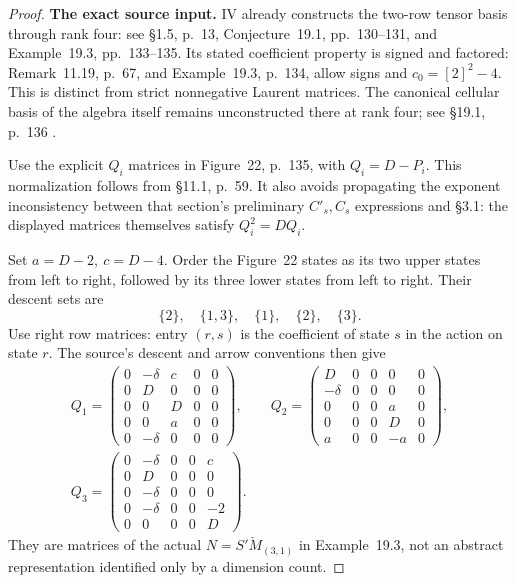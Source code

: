 \begin{proof}
\par\smallskip\noindent\textbf{The exact source input.}\quad
IV already constructs the two-row tensor basis through rank four:
see \S1.5, p.~13, Conjecture~19.1, pp.~130--131, and
Example~19.3, pp.~133--135.
Its stated coefficient property is signed and factored:
Remark~11.19, p.~67, and Example~19.3, p.~134, allow signs and
\(c_0=[2]^2-4\).
This is distinct from strict nonnegative Laurent matrices.
The canonical cellular basis of the algebra itself remains
unconstructed there at rank four; see \S19.1, p.~136
\cite{IV}.

Use the explicit \(Q_i\) matrices in Figure~22, p.~135,
with \(Q_i=D-P_i\).
This normalization follows from \S11.1, p.~59.
It also avoids propagating the exponent inconsistency between
that section's preliminary \(C'_s,C_s\) expressions and
\S3.1: the displayed matrices themselves satisfy \(Q_i^2=DQ_i\).

Set \(a=D-2,\ c=D-4\). Order the Figure~22 states as its
two upper states from left to right, followed by its three
lower states from left to right. Their descent sets are
\[
 \{2\},\quad\{1,3\},\quad\{1\},\quad\{2\},\quad\{3\}.
\]
Use right row matrices: entry \((r,s)\) is the coefficient of
state \(s\) in the action on state \(r\). The source's descent
and arrow conventions then give
\begin{equation}\label{eq:rankfourfivecellmatrices}
\begin{gathered}
Q_1=\begin{pmatrix}
0&-\delta&c&0&0\\
0&D&0&0&0\\
0&0&D&0&0\\
0&0&a&0&0\\
0&-\delta&0&0&0
\end{pmatrix},\qquad
Q_2=\begin{pmatrix}
D&0&0&0&0\\
-\delta&0&0&0&0\\
0&0&0&a&0\\
0&0&0&D&0\\
a&0&0&-a&0
\end{pmatrix},\\[2mm]
Q_3=\begin{pmatrix}
0&-\delta&0&0&c\\
0&D&0&0&0\\
0&-\delta&0&0&0\\
0&-\delta&0&0&-2\\
0&0&0&0&D
\end{pmatrix}.
\end{gathered}
\end{equation}
They are matrices of the actual \(N=S'\check M_{(3,1)}\)
in Example~19.3, not an abstract representation identified
only by a dimension count.


\end{proof}
